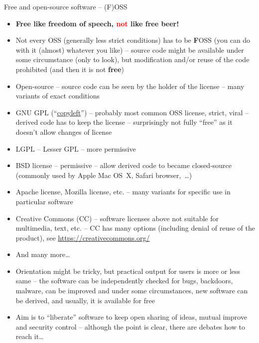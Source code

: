 \documentclass[compress, ucs, xelatex, 11pt, xcolor=svgnames,
  hyperref={
    bookmarks=true,
    unicode=true,
    colorlinks=true,
    pdftitle={Linux, command line and MetaCentrum},
    plainpages=false,
    pdfauthor={Vojtech Zeisek},
    pdfsubject={Course about use of Linux command line, writing shell scripts and using MetaCentrum of CESNET},
    pdfcreator={XeLaTeX},
    pdfkeywords={Linux, GNU, BASH, shell, command line, MetaCentrum},
    linkcolor=DarkRed,
    anchorcolor=DarkBlue,
    citecolor=Indigo,
    filecolor=NavyBlue,
    menucolor=DarkMagenta,
    urlcolor=DarkBlue,
    pdftex},
  url={hyphens, lowtilde} %
  ]{beamer}
\renewcommand{\alert}[1]{\textcolor{red}{#1}}
\begin{document}
\begin{frame}[allowframebreaks]{Free and open-source software -- (F)OSS}
  \begin{itemize}
    \item \textbf{Free like freedom of speech, \alert{not} like free beer!}
    \item Not every OSS (generally less strict conditions) has to be \textbf{F}OSS (you can do with it (almost) whatever you like) -- source code might be available under some circumstance (only to look), but modification and/or reuse of the code prohibited (and then it is not \textbf{free})
    \item Open-source -- source code can be seen by the holder of the license -- many variants of exact conditions
    \item GNU GPL (``\href{https://www.gnu.org/copyleft/}{copyleft}'') -- probably most common OSS license, strict, viral -- derived code has to keep the license -- surprisingly not fully ``free'' as it doesn't allow changes of license
    \item LGPL -- Lesser GPL -- more permissive
    \item BSD license -- permissive -- allow derived code to became closed-source (commonly used by Apple Mac OS~X, Safari browser,~\ldots)
    \item Apache license, Mozilla license, etc. -- many variants for specific use in particular software
    \item Creative Commons (CC) -- software licenses above not suitable for multimedia, text, etc. -- CC has many options (including denial of reuse of the product), see \url{https://creativecommons.org/}
    \item And many more\ldots
    \item Orientation might be tricky, but practical output for users is more or less same -- the software can be independently checked for bugs, backdoors, malware, can be improved and under some circumstances, new software can be derived, and usually, it is available for free
    \item Aim is to ``liberate'' software to keep open sharing of ideas, mutual improve and security control -- although the point is clear, there are debates how to reach it\ldots
  \end{itemize}
\end{frame}
\end{document}
